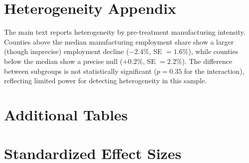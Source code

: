 \documentclass[12pt]{article}
\begin{document}
\section{Heterogeneity Appendix}
\label{app:heterogeneity}

The main text reports heterogeneity by pre-treatment manufacturing intensity. Counties above the median manufacturing employment share show a larger (though imprecise) employment decline ($-2.4\%$, SE $= 1.6\%$), while counties below the median show a precise null ($+0.2\%$, SE $= 2.2\%$). The difference between subgroups is not statistically significant ($p = 0.35$ for the interaction), reflecting limited power for detecting heterogeneity in this sample.

\section{Additional Tables}
\label{app:additional}


\section{Standardized Effect Sizes}
\label{sec:sde}


\end{document}

